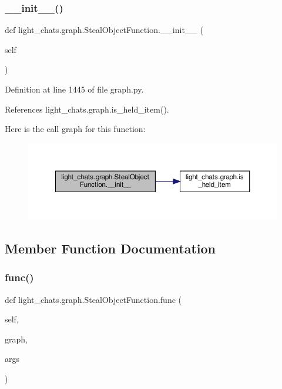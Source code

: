 \subsubsection{\texorpdfstring{\+\_\+\+\_\+init\+\_\+\+\_\+()}{\_\_init\_\_()}}
{\footnotesize\ttfamily def light\+\_\+chats.\+graph.\+Steal\+Object\+Function.\+\_\+\+\_\+init\+\_\+\+\_\+ (\begin{DoxyParamCaption}\item[{}]{self }\end{DoxyParamCaption})}



Definition at line 1445 of file graph.\+py.



References light\+\_\+chats.\+graph.\+is\+\_\+held\+\_\+item().

Here is the call graph for this function\+:
\nopagebreak
\begin{figure}[H]
\begin{center}
\leavevmode
\includegraphics[width=350pt]{classlight__chats_1_1graph_1_1StealObjectFunction_a388f35f7fac6a0b0814254867c0509c4_cgraph}
\end{center}
\end{figure}


\subsection{Member Function Documentation}
\mbox{\label{classlight__chats_1_1graph_1_1StealObjectFunction_a229fafa57d40e38da54a4b04947e2fe0}} 
\subsubsection{\texorpdfstring{func()}{func()}}
{\footnotesize\ttfamily def light\+\_\+chats.\+graph.\+Steal\+Object\+Function.\+func (\begin{DoxyParamCaption}\item[{}]{self,  }\item[{}]{graph,  }\item[{}]{args }\end{DoxyParamCaption})}


